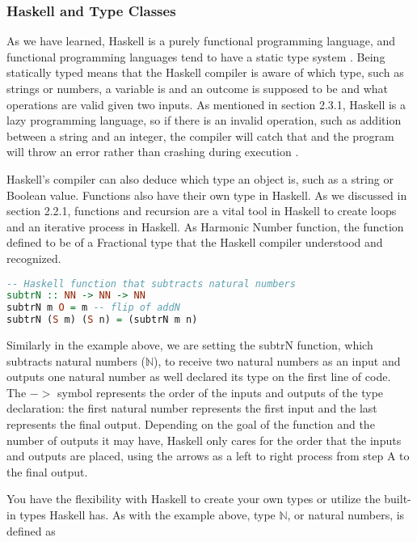\documentclass{article}
\begin{document}
\subsubsection{Haskell and Type Classes}

As we have learned, Haskell is a purely functional programming language, and functional programming languages tend to have a static type system \cite{LYH Types}. Being statically typed means that the Haskell compiler is aware of which type, such as strings or numbers, a variable is and an outcome is supposed to be and what operations are valid given two inputs. As mentioned in section 2.3.1, Haskell is a lazy programming language, so if there is an invalid operation, such as addition between a string and an integer, the compiler will catch that and the program will throw an error rather than crashing during execution \cite{LYH Types}. 

\medskip\noindent
Haskell's compiler can also deduce which type an object is, such as a string or Boolean value. Functions also have their own type in Haskell. As we discussed in section 2.2.1, functions and recursion are a vital tool in Haskell to create loops and an iterative process in Haskell. As Harmonic Number function, the function defined to be of a Fractional type that the Haskell compiler understood and recognized.  

\begin{lstlisting}[language=haskell]
-- Haskell function that subtracts natural numbers
subtrN :: NN -> NN -> NN
subtrN m O = m -- flip of addN
subtrN (S m) (S n) = (subtrN m n) 
\end{lstlisting}

\noindent
Similarly in the example above, we are setting the subtrN function, which subtracts natural numbers ($\mathbb N$), to receive two natural numbers as an input and outputs one natural number as well declared its type on the first line of code. The $->$ symbol represents the order of the inputs and outputs of the type declaration: the first natural number represents the first input and the last represents the final output. Depending on the goal of the function and the number of outputs it may have, Haskell only cares for the order that the inputs and outputs are placed, using the arrows as a left to right process from step A to the final output.

\medskip\noindent
You have the flexibility with Haskell to create your own types or utilize the built-in types Haskell has. As with the example above, type $\mathbb N$, or natural numbers, is defined as
\end{document}
